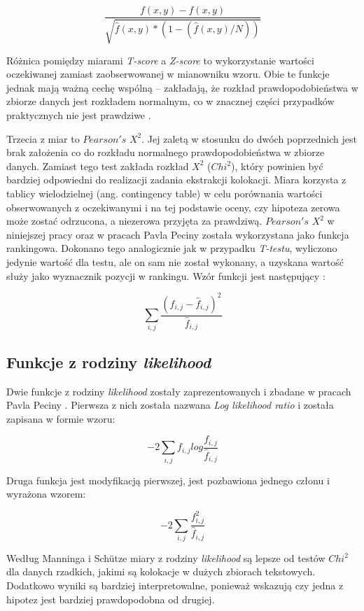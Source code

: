 $$ \frac{f(x, y) - \hat{f}(x, y) }{\sqrt{\hat{f}(x, y) * (1 - (\hat{f}(x, y) / N))}} $$

Różnica pomiędzy miarami \emph{T-score} a \emph{Z-score} to wykorzystanie wartości oczekiwanej zamiast zaobserwowanej w mianowniku wzoru.
Obie te funkcje jednak mają ważną cechę wspólną -- zakładają, że rozkład prawdopodobieństwa w zbiorze danych jest rozkładem normalnym, co w znacznej części przypadków praktycznych nie jest prawdziwe \cite[str. 169]{mit}.

\par
Trzecia z miar to $ Pearson's $ $ X^2 $.
Jej zaletą w stosunku do dwóch poprzednich jest brak założenia co do rozkładu normalnego prawdopodobieństwa w zbiorze danych.
Zamiast tego test zakłada rozkład $ X^2 $ ($ Chi^2 $), który powinien być bardziej odpowiedni do realizacji zadania ekstrakcji kolokacji.
Miara korzysta z tablicy wielodzielnej (ang. contingency table) \cite[str. 169]{mit} w celu porównania wartości obserwowanych z oczekiwanymi i na tej podstawie oceny, czy hipoteza zerowa może zostać odrzucona, a niezerowa przyjęta za prawdziwą.
$ Pearson's $ $ X^2 $ w niniejszej pracy oraz w pracach Pavla Peciny została wykorzystana jako funkcja rankingowa.
Dokonano tego analogicznie jak w przypadku \emph{T-testu}, wyliczono jedynie wartość dla testu, ale on sam nie został wykonany, a uzyskana wartość służy jako wyznacznik pozycji w rankingu.
Wzór funkcji jest następujący \cite[str. 18]{pecina_measures}:

$$ \sum_{i, j} \frac{(f_{i, j} - \hat{f}_{i, j})^{2}}{\hat{f}_{i, j}} $$


\subsection{Funkcje z rodziny \protect\textit{likelihood}}
Dwie funkcje z rodziny \emph{likelihood} zostały zaprezentowanych i zbadane w pracach Pavla Peciny \cite[str. 3]{coling}.
Pierwsza z nich została nazwana \emph{Log likelihood ratio} i została zapisana w formie wzoru:

$$ -2 \sum_{i, j} f_{i, j} log \frac{f_{i, j}}{\hat{f}_{i, j}} $$

Druga funkcja jest modyfikacją pierwszej, jest pozbawiona jednego członu i wyrażona wzorem:

$$ -2 \sum_{i, j} \frac{f_{i, j}^2}{\hat{f}_{i, j}} $$

Według Manninga i Schütze \cite[str. 172]{mit} miary z rodziny \emph{likelihood} są lepsze od testów $ Chi^2 $ dla danych rzadkich, jakimi są kolokacje w dużych zbiorach tekstowych. 
Dodatkowo wyniki są bardziej interpretowalne, ponieważ wskazują czy jedna z hipotez jest bardziej prawdopodobna od drugiej.



